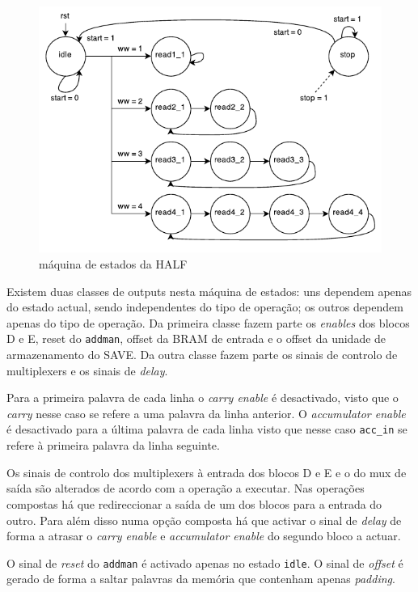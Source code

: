 \documentclass[a4paper]{article}
\begin{document}
\begin{figure}
	\centering
	\includegraphics[width=0.8\linewidth]{HALF_FSM}
	\caption{máquina de estados da HALF}
	\label{fig:HALF_FSM}
\end{figure}

Existem duas classes de outputs nesta máquina de estados: uns dependem apenas do estado actual, sendo independentes do tipo de operação; os outros dependem apenas do tipo de operação. Da primeira classe fazem parte os \textit{enables} dos blocos D e E, reset do \texttt{addman}, offset da BRAM de entrada e o offset da unidade de armazenamento do SAVE. Da outra classe fazem parte os sinais de controlo de multiplexers e os sinais de \textit{delay}.

Para a primeira palavra de cada linha o \textit{carry enable} é desactivado, visto que o \textit{carry} nesse caso se refere a uma palavra da linha anterior. O \textit{accumulator enable} é desactivado para a última palavra de cada linha visto que nesse caso \texttt{acc\_in} se refere à primeira palavra da linha seguinte.

Os sinais de controlo dos multiplexers à entrada dos blocos D e E e o do mux de saída são alterados de acordo com a operação a executar. Nas operações compostas há que redireccionar a saída de um dos blocos para a entrada do outro. Para além disso numa opção composta há que activar o sinal de \textit{delay} de forma a atrasar o \textit{carry enable} e \textit{accumulator enable} do segundo bloco a actuar.

O sinal de \textit{reset} do \texttt{addman} é activado apenas no estado \texttt{idle}. O sinal de \textit{offset} é gerado de forma a saltar palavras da memória que contenham apenas \textit{padding}.
\end{document}
